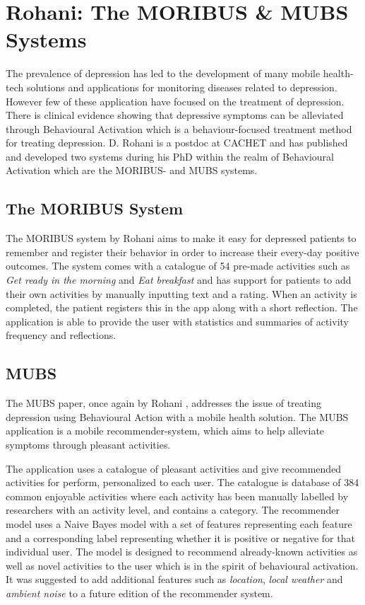 \section{Rohani: The MORIBUS \& MUBS Systems}
The prevalence of depression has led to the development of many mobile health-tech solutions and applications for monitoring diseases related to depression. However few of these application have focused on the treatment of depression. There is clinical evidence showing that depressive symptoms can be alleviated through Behavioural Activation which is a behaviour-focused treatment method for treating depression. D. Rohani is a postdoc at CACHET and has published and developed two systems during his PhD within the realm of Behavioural Activation which are the MORIBUS- and MUBS systems.

\subsection{The MORIBUS System}
The MORIBUS system \cite{moribus} by Rohani aims to make it easy for depressed patients to remember and register their behavior in order to increase their every-day positive outcomes. The system comes with a catalogue of 54 pre-made activities such as \textit{Get ready in the morning} and \textit{Eat breakfast} and has support for patients to add their own activities by manually inputting text and a rating. When an activity is completed, the patient registers this in the app along with a short reflection. The application   is able to provide the user with statistics and summaries of activity frequency and reflections.

\subsection{MUBS}
The MUBS paper, once again by Rohani  \cite{mubs-rohani}, addresses the issue of treating depression using Behavioural Action with a mobile health solution. The MUBS application is a mobile recommender-system, which aims to help alleviate symptoms through pleasant activities. 

The application uses a catalogue of pleasant activities and give recommended activities for perform, personalized to each user. The catalogue is database of 384 common enjoyable activities where each activity has been manually labelled by researchers with an activity level, and contains a category. The recommender model uses a Naive Bayes model with a set of features representing each feature and a corresponding label representing whether it is positive or negative for that individual user. The model is designed to recommend already-known activities as well as novel activities to the user which is in the spirit of behavioural activation. It was suggested to add additional features such as \textit{location}, \textit{local weather} and \textit{ambient noise} to a future edition of the recommender system. 

